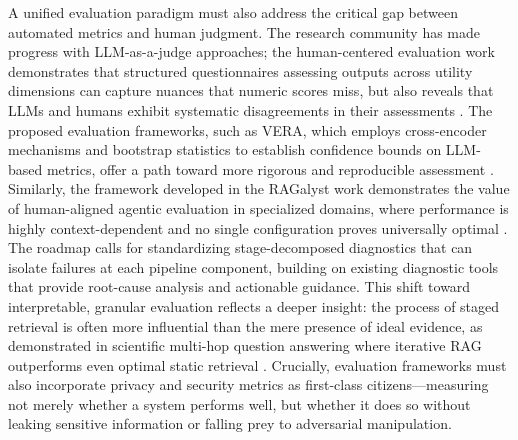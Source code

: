 \documentclass[11pt]{article}
\begin{document}
A unified evaluation paradigm must also address the critical gap between automated metrics and human judgment. The research community has made progress with LLM-as-a-judge approaches; the human-centered evaluation work demonstrates that structured questionnaires assessing outputs across utility dimensions can capture nuances that numeric scores miss, but also reveals that LLMs and humans exhibit systematic disagreements in their assessments \cite{ref78}. The proposed evaluation frameworks, such as VERA, which employs cross-encoder mechanisms and bootstrap statistics to establish confidence bounds on LLM-based metrics, offer a path toward more rigorous and reproducible assessment \cite{ref627}. Similarly, the framework developed in the RAGalyst work demonstrates the value of human-aligned agentic evaluation in specialized domains, where performance is highly context-dependent and no single configuration proves universally optimal \cite{ref588}. The roadmap calls for standardizing stage-decomposed diagnostics that can isolate failures at each pipeline component, building on existing diagnostic tools that provide root-cause analysis and actionable guidance. This shift toward interpretable, granular evaluation reflects a deeper insight: the process of staged retrieval is often more influential than the mere presence of ideal evidence, as demonstrated in scientific multi-hop question answering where iterative RAG outperforms even optimal static retrieval \cite{ref170}. Crucially, evaluation frameworks must also incorporate privacy and security metrics as first-class citizens---measuring not merely whether a system performs well, but whether it does so without leaking sensitive information or falling prey to adversarial manipulation.
\end{document}
